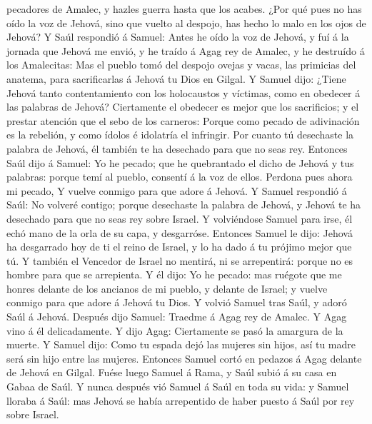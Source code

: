 pecadores de Amalec, y hazles guerra hasta que los acabes.
 ¿Por qué pues no has oído la voz de Jehová, sino que
vuelto al despojo, has hecho lo malo en los ojos de Jehová?
 Y Saúl respondió á Samuel: Antes he oído la voz de
Jehová, y fuí á la jornada que Jehová me envió, y he traído á Agag rey
de Amalec, y he destruído á los Amalecitas:  Mas el
pueblo tomó del despojo ovejas y vacas, las primicias del anatema, para
sacrificarlas á Jehová tu Dios en Gilgal.  Y Samuel dijo:
¿Tiene Jehová tanto contentamiento con los holocaustos y víctimas, como
en obedecer á las palabras de Jehová? Ciertamente el obedecer es mejor
que los sacrificios; y el prestar atención que el sebo de los carneros:
 Porque como pecado de adivinación es la rebelión, y como
ídolos é idolatría el infringir. Por cuanto tú desechaste la palabra de
Jehová, él también te ha desechado para que no seas rey. 
Entonces Saúl dijo á Samuel: Yo he pecado; que he quebrantado el dicho
de Jehová y tus palabras: porque temí al pueblo, consentí á la voz de
ellos. Perdona pues ahora mi pecado,  Y vuelve conmigo
para que adore á Jehová.  Y Samuel respondió á Saúl: No
volveré contigo; porque desechaste la palabra de Jehová, y Jehová te ha
desechado para que no seas rey sobre Israel.  Y
volviéndose Samuel para irse, él echó mano de la orla de su capa, y
desgarróse.  Entonces Samuel le dijo: Jehová ha
desgarrado hoy de ti el reino de Israel, y lo ha dado á tu prójimo mejor
que tú.  Y también el Vencedor de Israel no mentirá, ni
se arrepentirá: porque no es hombre para que se arrepienta.
 Y él dijo: Yo he pecado: mas ruégote que me honres
delante de los ancianos de mi pueblo, y delante de Israel; y vuelve
conmigo para que adore á Jehová tu Dios.  Y volvió Samuel
tras Saúl, y adoró Saúl á Jehová.  Después dijo Samuel:
Traedme á Agag rey de Amalec. Y Agag vino á él delicadamente. Y dijo
Agag: Ciertamente se pasó la amargura de la muerte.  Y
Samuel dijo: Como tu espada dejó las mujeres sin hijos, así tu madre
será sin hijo entre las mujeres. Entonces Samuel cortó en pedazos á Agag
delante de Jehová en Gilgal.  Fuése luego Samuel á Rama,
y Saúl subió á su casa en Gabaa de Saúl.  Y nunca después
vió Samuel á Saúl en toda su vida: y Samuel lloraba á Saúl: mas Jehová
se había arrepentido de haber puesto á Saúl por rey sobre Israel.

